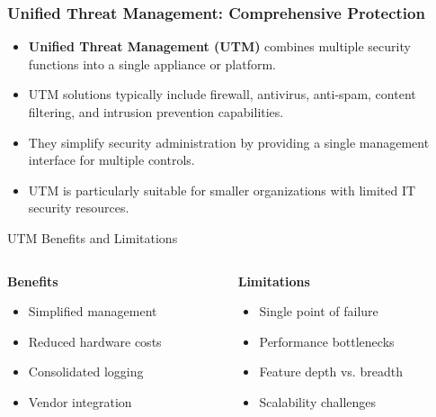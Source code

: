 \documentclass{beamer}
\begin{document}
\begin{frame}
    \frametitle{Unified Threat Management: Comprehensive Protection}
    \begin{itemize}
        \item \textbf{Unified Threat Management (UTM)} combines multiple security functions into a single appliance or platform.
        \item UTM solutions typically include firewall, antivirus, anti-spam, content filtering, and intrusion prevention capabilities.
        \item They simplify security administration by providing a single management interface for multiple controls.
        \item UTM is particularly suitable for smaller organizations with limited IT security resources.
    \end{itemize}
    
    \begin{block}{UTM Benefits and Limitations}
        \begin{columns}
            \begin{column}{0.48\textwidth}
                \textbf{Benefits}
                \begin{itemize}
                    \item Simplified management
                    \item Reduced hardware costs
                    \item Consolidated logging
                    \item Vendor integration
                \end{itemize}
            \end{column}
            \begin{column}{0.48\textwidth}
                \textbf{Limitations}
                \begin{itemize}
                    \item Single point of failure
                    \item Performance bottlenecks
                    \item Feature depth vs. breadth
                    \item Scalability challenges
                \end{itemize}
            \end{column}
        \end{columns}
    \end{block}
\end{frame}
\end{document}
